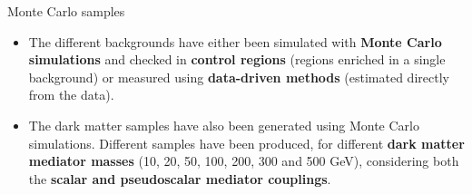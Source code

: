 \documentclass[handout,8 pt]{beamer}
\begin{document}
\begin{frame}{Monte Carlo samples}
	
	\begin{itemize}
	\justifying
	\item The different backgrounds have either been simulated with \textbf{Monte Carlo simulations} and checked in \textbf{control regions} (regions enriched in a single background) or measured using \textbf{data-driven methods} (estimated directly from the data). \\ \vspace{8pt} 
	\item The dark matter samples have also been generated using Monte Carlo simulations. Different samples have been produced, for different \textbf{dark matter mediator masses} (10, 20, 50, 100, 200, 300 and 500 GeV), considering both the \textbf{scalar and pseudoscalar mediator couplings}.
	\end{itemize} \vfill 


\end{frame}
\end{document}
